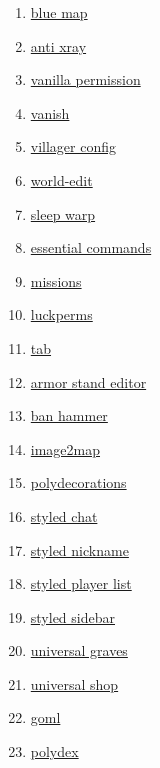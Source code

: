 \begin{enumerate}
    \item \href{https://github.com/BlueMap-Minecraft/BlueMap}{blue map}
    \item \href{https://github.com/DrexHD/AntiXray}{anti xray}
    \item \href{https://github.com/DrexHD/VanillaPermissions}{vanilla permission}
    \item \href{https://github.com/DrexHD/Vanish}{vanish}
    \item \href{https://github.com/DrexHD/VillagerConfig/}{villager config}
    \item \href{https://github.com/EngineHub/WorldEdit/}{world-edit}
    \item \href{https://github.com/Giggitybyte/SleepWarp}{sleep warp}
    \item \href{https://github.com/John-Paul-R/Essential-Commands}{essential commands}
    \item \href{https://github.com/Kryeit/Missions}{missions}
    \item \href{https://github.com/LuckPerms/LuckPerms}{luckperms}
    \item \href{https://github.com/NEZNAMY/TAB}{tab}
    \item \href{https://github.com/Patbox/ArmorStandEditor}{armor stand editor}
    \item \href{https://github.com/Patbox/BanHammer}{ban hammer}
    \item \href{https://github.com/Patbox/Image2Map}{image2map}
    \item \href{https://github.com/Patbox/PolyDecorations}{polydecorations}
    \item \href{https://github.com/Patbox/StyledChat}{styled chat}
    \item \href{https://github.com/Patbox/StyledNicknames}{styled nickname}
    \item \href{https://github.com/Patbox/StyledPlayerList}{styled player list}
    \item \href{https://github.com/Patbox/StyledSidebars}{styled sidebar}
    \item \href{https://github.com/Patbox/UniversalGraves}{universal graves}
    \item \href{https://github.com/Patbox/UniversalShops}{universal shop}
    \item \href{https://github.com/Patbox/get-off-my-lawn-reserved}{goml}
    \item \href{https://github.com/Patbox/polydex}{polydex}

\end{enumerate}

